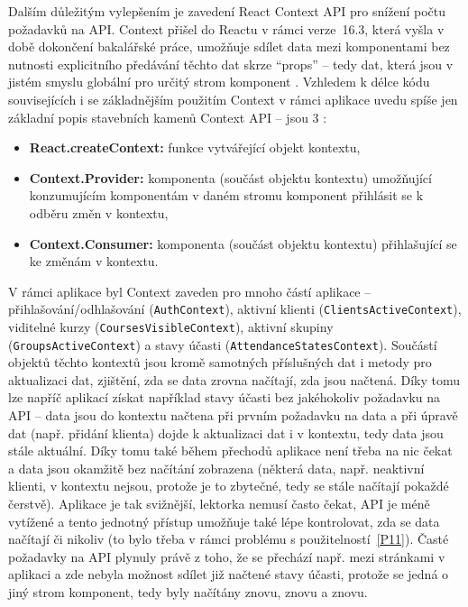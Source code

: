 Dalším důležitým vylepšením je zavedení React Context API pro snížení počtu požadavků na API. Context přišel do Reactu v rámci verze~16.3, která vyšla v době dokončení bakalářské práce, umožňuje sdílet data mezi komponentami bez nutnosti explicitního předávání těchto dat skrze \enquote{props} -- tedy dat, která jsou v jistém smyslu globální pro určitý strom komponent \cite{react-context}. Vzhledem k délce kódu souvisejících i se základnějším použitím Context v rámci aplikace uvedu spíše jen základní popis stavebních kamenů Context API -- jsou 3 \cite{react-context}:
\begin{itemize}
    \item \textbf{React.createContext:} funkce vytvářející objekt kontextu,
    \item \textbf{Context.Provider:} komponenta (součást objektu kontextu) umožňující konzumujícím komponentám v daném stromu komponent přihlásit se k odběru změn v kontextu,
    \item \textbf{Context.Consumer:} komponenta (součást objektu kontextu) přihlašující se ke změnám v kontextu.
\end{itemize}

V rámci aplikace byl Context zaveden pro mnoho částí aplikace -- přihlašování/odhlašování (\verb|AuthContext|), aktivní klienti (\verb|ClientsActiveContext|), viditelné kurzy (\verb|CoursesVisibleContext|), aktivní skupiny (\verb|GroupsActiveContext|) a stavy účasti (\verb|AttendanceStatesContext|). Součástí objektů těchto kontextů jsou kromě samotných příslušných dat i metody pro aktualizaci dat, zjištění, zda se data zrovna načítají, zda jsou načtená. Díky tomu lze napříč aplikací získat například stavy účasti bez jakéhokoliv požadavku na API -- data jsou do kontextu načtena při prvním požadavku na data a při úpravě dat (např. přidání klienta) dojde k aktualizaci dat i v kontextu, tedy data jsou stále aktuální. Díky tomu také během přechodů aplikace není třeba na nic čekat a data jsou okamžitě bez načítání zobrazena (některá data, např. neaktivní klienti, v kontextu nejsou, protože je to zbytečné, tedy se stále načítají pokaždé čerstvě). Aplikace je tak svižnější, lektorka nemusí často čekat, API je méně vytížené a tento jednotný přístup umožňuje také lépe kontrolovat, zda se data načítají či nikoliv (to bylo třeba v rámci problému s použitelností~\ref{P11}). Časté požadavky na API plynuly právě z toho, že se přechází např. mezi stránkami v aplikaci a zde nebyla možnost sdílet již načtené stavy účasti, protože se jedná o jiný strom komponent, tedy byly načítány znovu, znovu a znovu.

